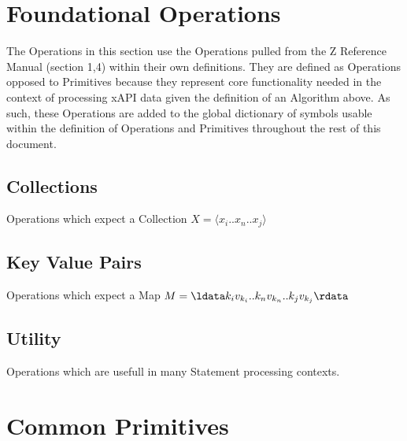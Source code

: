 \documentclass{article}
\begin{document}




\section{Foundational Operations}
The Operations in this section use the Operations pulled from the Z Reference Manual (section 1,4) within their own definitions.
They are defined as Operations opposed to Primitives because they represent core functionality needed in the context
of processing xAPI data given the definition of an Algorithm above. As such, these Operations are added to the global
dictionary of symbols usable within the definition of Operations and Primitives throughout the rest of this document.
\subsection{Collections}
Operations which expect a Collection $X = \langle x_{i}..x_{n}..x_{j} \rangle$





\subsection{Key Value Pairs}
Operations which expect a Map $M = \ldata k_{i}v_{k_{i}}..k_{n}v_{k_{n}}..k_{j}v_{k_{j}} \rdata$






\subsection{Utility}
Operations which are usefull in many Statement processing contexts.




\section{Common Primitives}



\end{document}
